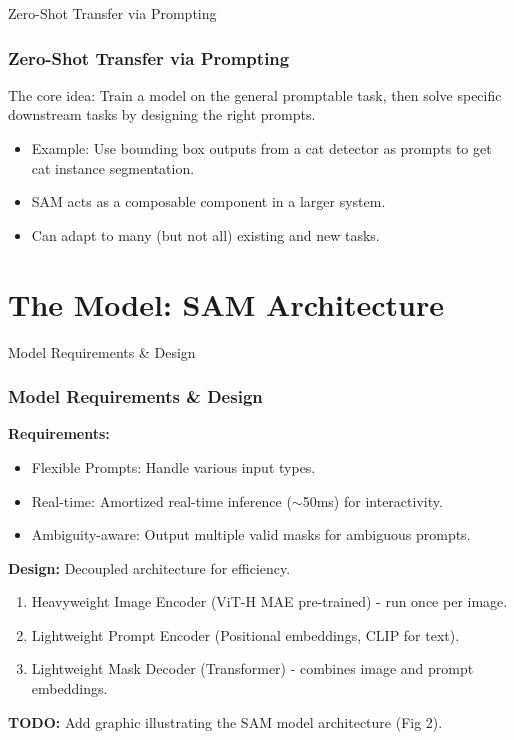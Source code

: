 \documentclass{beamer}
\begin{document}
\begin{frame}{Zero-Shot Transfer via Prompting}
    \frametitle{Zero-Shot Transfer via Prompting}
    The core idea: Train a model on the general promptable task, then solve specific downstream tasks by designing the right prompts.
    \begin{itemize}
        \item Example: Use bounding box outputs from a cat detector as prompts to get cat instance segmentation.
        \item SAM acts as a composable component in a larger system.
        \item Can adapt to many (but not all) existing and new tasks.
    \end{itemize}
\end{frame}

\section{The Model: SAM Architecture}

\begin{frame}{Model Requirements & Design}
    \frametitle{Model Requirements \& Design}
    \textbf{Requirements:}
    \begin{itemize}
        \item Flexible Prompts: Handle various input types.
        \item Real-time: Amortized real-time inference ($\sim$50ms) for interactivity.
        \item Ambiguity-aware: Output multiple valid masks for ambiguous prompts.
    \end{itemize}
    \textbf{Design:} Decoupled architecture for efficiency.
    \begin{enumerate}
        \item Heavyweight Image Encoder (ViT-H MAE pre-trained) - run once per image.
        \item Lightweight Prompt Encoder (Positional embeddings, CLIP for text).
        \item Lightweight Mask Decoder (Transformer) - combines image and prompt embeddings.
    \end{enumerate}
    \vfill
    \textbf{TODO:} Add graphic illustrating the SAM model architecture (Fig 2).
\end{frame}
\end{document}
